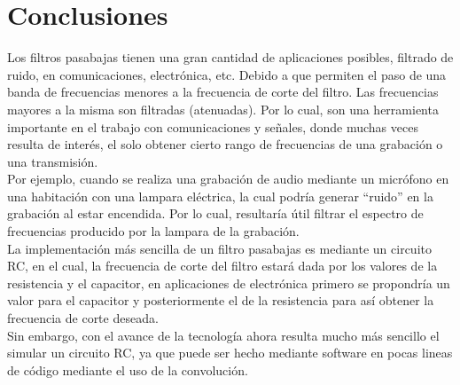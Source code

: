 \section{Conclusiones}
Los filtros pasabajas tienen una gran cantidad de aplicaciones posibles, filtrado de ruido, en comunicaciones, electrónica, etc. Debido a que permiten el paso de una banda de frecuencias menores a la frecuencia de corte del filtro. Las frecuencias mayores a la misma son filtradas (atenuadas). Por lo cual, son una herramienta importante en el trabajo con comunicaciones y señales, donde muchas veces resulta de interés, el solo obtener cierto rango de frecuencias de una grabación o una transmisión.\\ Por ejemplo, cuando se realiza una grabación de audio mediante un micrófono en una habitación con una lampara eléctrica, la cual podría generar ``ruido'' en la grabación al estar encendida. Por lo cual, resultaría útil filtrar el espectro de frecuencias producido por la lampara de la grabación.\\ La implementación más sencilla de un filtro pasabajas es mediante un circuito RC, en el cual, la frecuencia de corte del filtro estará dada por los valores de la resistencia y el capacitor, en aplicaciones de electrónica primero se propondría un valor para el capacitor y posteriormente el de la resistencia para así obtener la frecuencia de corte deseada.\\ Sin embargo, con el avance de la tecnología ahora resulta mucho más sencillo el simular un circuito RC, ya que puede ser hecho mediante software en pocas lineas de código mediante el uso de la convolución.